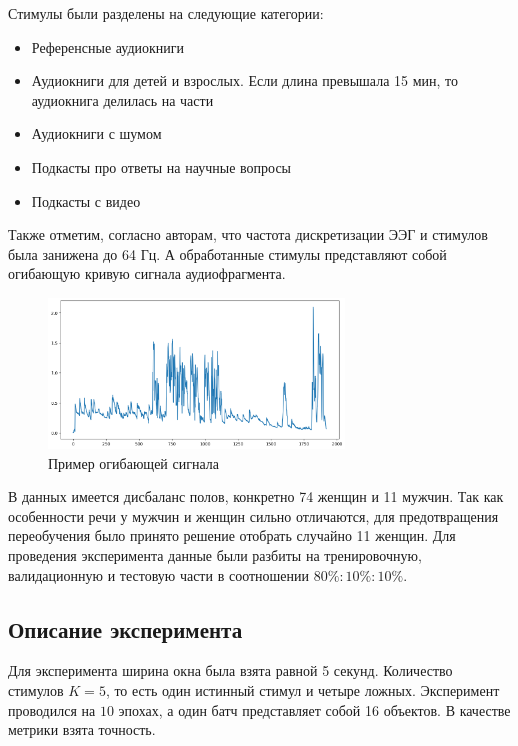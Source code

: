 \documentclass{article}
\begin{document}
    Стимулы были разделены на следующие категории:

    \begin{itemize}
        \item Референсные аудиокниги
        \item Аудиокниги для детей и взрослых. Если длина превышала 15 мин, то аудиокнига делилась на части
        \item Аудиокниги с шумом
        \item Подкасты про ответы на научные вопросы
        \item Подкасты с видео
    \end{itemize}

    Также отметим, согласно авторам, что частота дискретизации ЭЭГ и стимулов была занижена до 64 Гц. А обработанные стимулы представляют собой огибающую кривую сигнала аудиофрагмента.
    
    \begin{figure}[h]
	\centering
	\includegraphics[width=0.7\textwidth]{presented_stimuli.png}
	\caption{Пример огибающей сигнала}
	\label{envelope}
    \end{figure}

    В данных имеется дисбаланс полов, конкретно 74 женщин и 11 мужчин. Так как особенности речи у мужчин и женщин сильно отличаются, для предотвращения переобучения было принято решение отобрать случайно 11 женщин. Для проведения эксперимента данные были разбиты на тренировочную, валидационную и тестовую части в соотношении $80\% : 10\%  : 10\%$. 

    

    \subsection{Описание эксперимента}    
    Для эксперимента ширина окна была взята равной 5 секунд. Количество стимулов $K=5$, то есть один истинный стимул и четыре ложных. Эксперимент проводился на $10$ эпохах, а один батч представляет собой 16 объектов. В качестве метрики взята точность. 
    
\end{document}
